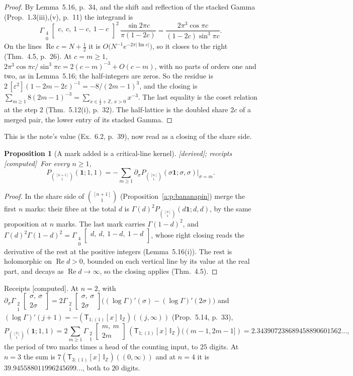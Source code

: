 \documentclass[11pt]{article}
\newcommand{\one}{\mathbf 1}
\newcommand{\sT}{\mathsf T}
\newcommand{\Gst}[4]{\Gamma_{\substack{#1\\#2}}\!\begin{bmatrix}#3\\#4\end{bmatrix}}
\newcommand{\IZ}{\mathbb I_{\mathbb Z}}
\newcommand{\Tx}[3]{(\sT_{#1;(1)}[x]\,#2)((#3,\infty))}
\DeclareMathOperator{\re}{Re}
\DeclareMathOperator{\im}{Im}
\theoremstyle{plain}
\newtheorem{proposition}{Proposition}[section]
\theoremstyle{definition}
\theoremstyle{remark}
\newcommand{\derived}{\textup{[derived]}}
\newcommand{\computed}{\textup{[computed]}}
\begin{document}
\begin{proof}
By Lemma~5.16, p.~34, and the shift and reflection of the stacked Gamma (Prop.~1.3(iii),(v), p.~11) the integrand is
\[
\Gst40{c,\ c,\ 1-c,\ 1-c}{}^2\,\frac{\sin2\pi c}{\pi(1-2c)}=\frac{2\pi^3\cos\pi c}{(1-2c)\sin^3\pi c}.
\]
On the lines $\re c=N+\frac12$ it is $O\big(N^{-1}e^{-2\pi|\im c|}\big)$, so it closes to the right (Thm.~4.5, p.~26). At $c=m\ge1$, $2\pi^3\cos\pi c/\sin^3\pi c=2(c-m)^{-3}+O(c-m)$, with no parts of orders one and two, as in Lemma~5.16; the half-integers are zeros. So the residue is $2\,[\varepsilon^2](1-2m-2\varepsilon)^{-1}=-8/(2m-1)^3$, and the closing is $\sum_{m\ge1}8(2m-1)^{-3}=\sum_{x\in\frac12+\mathbb Z,\,x>0}x^{-3}$. The last equality is the coset relation at the step $2$ (Thm.~5.12(i), p.~32). The half-lattice is the doubled share $2c$ of a merged pair, the lower entry of its stacked Gamma.
\end{proof}

\noindent This is the note's value (Ex.~6.2, p.~39), now read as a closing of the share side.

\begin{proposition}[A mark added is a critical-line kernel]\label{a:p:addmark}\derived; receipts \computed\
For every $n\ge1$,
\[
P_{\binom{[n+1]}1}(\one;1,1)=-\sum_{m\ge1}\partial_\sigma P_{\binom{[n]}1}(\sigma\one;\sigma,\sigma)\big|_{\sigma=m}.
\]
\end{proposition}

\begin{proof}
In the share side of $\binom{[n+1]}1$ (Proposition~\ref{a:p:bananapin}) merge the first $n$ marks: their fibre at the total $d$ is $\Gamma(d)^2P_{\binom{[n]}1}(d\one;d,d)$, by the same proposition at $n$ marks. The last mark carries $\Gamma(1-d)^2$, and $\Gamma(d)^2\Gamma(1-d)^2=\Gst40{d,\ d,\ 1-d,\ 1-d}{}$, whose right closing reads the derivative of the rest at the positive integers (Lemma~5.16(i)). The rest is holomorphic on $\re d>0$, bounded on each vertical line by its value at the real part, and decays as $\re d\to\infty$, so the closing applies (Thm.~4.5).
\end{proof}

\noindent Receipts \computed. At $n=2$, with $\partial_\sigma\Gst21{\sigma,\ \sigma}{2\sigma}=2\Gst21{\sigma,\ \sigma}{2\sigma}\big((\log\Gamma)'(\sigma)-(\log\Gamma)'(2\sigma)\big)$ and $(\log\Gamma)'(j+1)=-\Tx{1}{\IZ}{j}$ (Prop.~5.14, p.~33),
\[
P_{\binom{[3]}1}(\one;1,1)=2\sum_{m\ge1}\Gst21{m,\ m}{2m}\,(\sT_{1;(1)}[x]\,\IZ)((m-1,2m-1])=2.343907238689458890601562\ldots,
\]
the period of two marks times a head of the counting input, to $25$ digits. At $n=3$ the sum is $7\Tx{3}{\IZ}{0}$ and at $n=4$ it is $39.945588011996245699\ldots$, both to $20$ digits.
\end{document}
